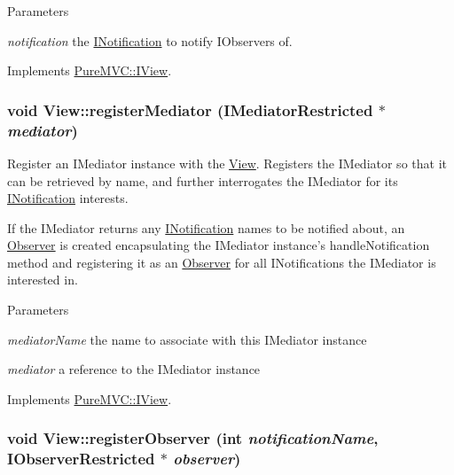 \begin{DoxyParams}{Parameters}
\item[{\em notification}]the {\ttfamily \hyperlink{class_pure_m_v_c_1_1_i_notification}{INotification}} to notify {\ttfamily IObservers} of. \end{DoxyParams}


Implements \hyperlink{class_pure_m_v_c_1_1_i_view_aa0123eeed26fc15fe067e3171936d143}{PureMVC::IView}.\hypertarget{class_pure_m_v_c_1_1_view_a6980c6deed6fff89a94c8cb09df7a644}{
\subsubsection[{registerMediator}]{\setlength{\rightskip}{0pt plus 5cm}void View::registerMediator ({\bf IMediatorRestricted} $\ast$ {\em mediator})}}
\label{class_pure_m_v_c_1_1_view_a6980c6deed6fff89a94c8cb09df7a644}


Register an {\ttfamily IMediator} instance with the {\ttfamily \hyperlink{class_pure_m_v_c_1_1_view}{View}}. Registers the {\ttfamily IMediator} so that it can be retrieved by name, and further interrogates the {\ttfamily IMediator} for its {\ttfamily \hyperlink{class_pure_m_v_c_1_1_i_notification}{INotification}} interests. 

If the {\ttfamily IMediator} returns any {\ttfamily \hyperlink{class_pure_m_v_c_1_1_i_notification}{INotification}} names to be notified about, an {\ttfamily \hyperlink{class_pure_m_v_c_1_1_observer}{Observer}} is created encapsulating the {\ttfamily IMediator} instance's {\ttfamily handleNotification} method and registering it as an {\ttfamily \hyperlink{class_pure_m_v_c_1_1_observer}{Observer}} for all {\ttfamily INotifications} the {\ttfamily IMediator} is interested in.


\begin{DoxyParams}{Parameters}
\item[{\em mediatorName}]the name to associate with this {\ttfamily IMediator} instance \item[{\em mediator}]a reference to the {\ttfamily IMediator} instance \end{DoxyParams}


Implements \hyperlink{class_pure_m_v_c_1_1_i_view_a16db7b04ff8a9f03b65ae4c9beecb48d}{PureMVC::IView}.\hypertarget{class_pure_m_v_c_1_1_view_a42ebef42cf8d7dc72d05e4c11e75cd66}{
\subsubsection[{registerObserver}]{\setlength{\rightskip}{0pt plus 5cm}void View::registerObserver (int {\em notificationName}, \/  {\bf IObserverRestricted} $\ast$ {\em observer})}}
\label{class_pure_m_v_c_1_1_view_a42ebef42cf8d7dc72d05e4c11e75cd66}


